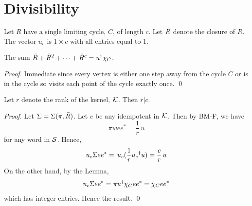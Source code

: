 

\section{Divisibility}
\label{sec:6.7}


Let $R$ have a single limiting cycle, $C$, of length $c$. Let ${\bar R}$ denote the closure of $R$.
The vector $u_c$ is $1\times c$ with all entries equal to 1. 

\begin{lemma} 		\label{lem:6.1}
The sum $\R+\R^2+\cdots+\R^c=\dg u.\chi_C$.
\end{lemma}

\begin{proof} Immediate since every vertex is either one step away from the cycle $C$ or is in the cycle so visits each point of the cycle exactly once. \qed
\end{proof}

\begin{theorem} 	\label{thm:6.4}
Let $r$ denote the rank of the kernel, ${\mathcal K}$. Then $r|c$.
\end{theorem}

\begin{proof} Let $\Sigma=\Sigma(\pi,{\bar R})$.
Let $e$ be any idempotent in ${\mathcal K}$. Then by BM-F, we have 
$$
  \pi w ee^*=\frac{1}{r}\,u
$$ 
for any word in ${\mathcal S}$. Hence,
$$
  u_c\Sigma ee^*=\,u_c(\frac{1}{r}\dg u_c.u)=\frac{c}{r}\,u
$$
On the other hand, by the Lemma,
$$
  u_c\Sigma ee^*=\pi\dg u.\chi_Cee^*=\chi_Cee^*
$$
which has integer entries. Hence the result. \qed
\end{proof}
